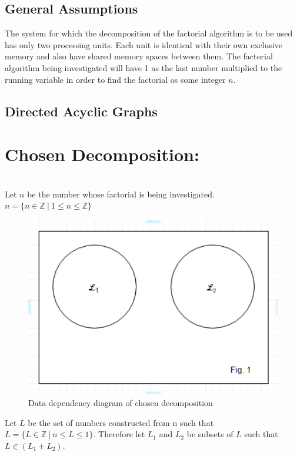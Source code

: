 \documentclass[11pt]{article}
\begin{document}
\begin{page}

\clearpage
\setcounter{page}{1}

\section{General Assumptions}
The system for which the decomposition of the factorial algorithm is to be used has only two processing units. Each unit is identical with their own exclusive memory and also have shared memory spaces between them. The factorial algorithm being investigated will have 1 as the last number multiplied to the running variable in order to find the factorial os some integer $n$.

\section{Directed Acyclic Graphs}
\noindent \chapter{Chosen Decomposition:} \\
\noindent Let $n$ be the number whose factorial is being investigated. \\
$ n = \{ n \in \mathbb{Z}\ |\ 1 \leq n \leq \mathbb{Z}\} $ 
\\

\begin{figure}
\centering
     \includegraphics[width=1.0\textwidth]{parallel_fig1}\\
     Data dependency diagram of chosen decomposition
\end{figure}
\noindent Let $L$ be the set of numbers constructed from n such that $L = \{ L \in \mathbb{Z}\ |\ n \leq L \leq 1\}$.
Therefore let $L_1$ and $L_2$ be subsets of $L$ such that $L \in (L_1 + L_2) $.


\end{page}
\end{document}
